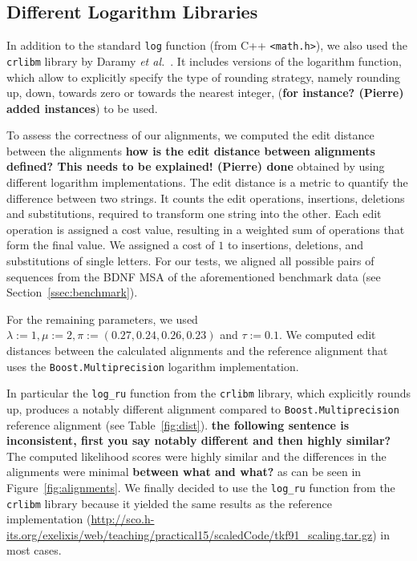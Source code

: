 \documentclass[runningheads,a4paper]{llncs}
\begin{document}

\subsection{Different Logarithm Libraries}
\label{sec:crlibm}

In addition to the standard \texttt{log} function (from C++ \texttt{<math.h>}), 
we also used the \texttt{crlibm} library by Daramy {\em et al.}~\cite{Daramy04}. 
It includes versions of the logarithm function, which allow to explicitly specify the type of rounding strategy, namely rounding up, down, towards zero or towards the nearest integer, ({\bf for instance? (Pierre) added instances}) to be used.

To assess the correctness of our alignments, we computed the edit distance between the alignments {\bf how is the edit distance between alignments defined? This needs to be explained! (Pierre) done} 
obtained by using different logarithm implementations. 
The edit distance is a metric to quantify the difference between two strings. It counts the edit operations, insertions, deletions and substitutions, required to transform one string into the other. Each edit operation is assigned a cost value, resulting in a weighted sum of operations that form the final value.
We assigned a cost of $1$ to insertions, deletions, and substitutions of single letters. 
For our tests, we aligned all possible pairs of sequences from the BDNF MSA of the aforementioned benchmark data (see Section~\ref{ssec:benchmark}).

For the remaining parameters, we used $\lambda:=1, \mu:=2, \pi:= (0.27, 0.24, 0.26, 0.23)$ and $\tau := 0.1$. 
We computed edit distances between the calculated alignments and the reference alignment that uses the \texttt{Boost.Multiprecision} logarithm implementation. 

In particular the \texttt{log\_ru} function from the \texttt{crlibm} library, which explicitly rounds up, produces a notably different alignment compared to 
\texttt{Boost.Multiprecision} reference alignment (see Table~\ref{fig:dist}). 
{\bf the following sentence is inconsistent, first you say notably different and then highly similar?} 
The computed likelihood scores were highly similar and the differences in the alignments were minimal {\bf between what and what?} as can be seen in Figure~\ref{fig:alignments}. 
We finally decided to use the \texttt{log\_ru} function from the \texttt{crlibm} library because it yielded the same results as the reference implementation 
(\url{http://sco.h-its.org/exelixis/web/teaching/practical15/scaledCode/tkf91_scaling.tar.gz}) in most cases.
\end{document}
